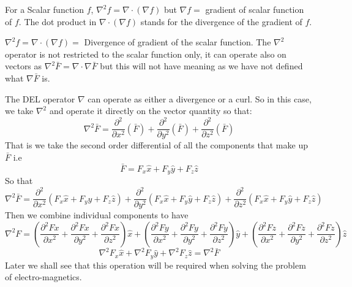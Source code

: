 For a Scalar function $f$, $\nabla^2f = \nabla \cdot (\nabla f)$ but $\nabla f =$ gradient of scalar function of $f$. The dot product in $\nabla \cdot (\nabla f) $ stands for the divergence of the gradient of $f$.

$\nabla^2 f= \nabla \cdot (\nabla f) =$ Divergence of gradient of the scalar function. The $\nabla^2 $ operator is not restricted to the scalar function only, it can operate also on vectors as $\nabla^2 \bar{F} = \nabla \cdot \nabla \bar{F}$ but this will not have meaning as we have not defined what $\nabla \bar{F}$ is.


The DEL operator $\nabla$ can operate as either a divergence or a curl. So in this case, we take $\nabla^2$ and operate it directly on the vector quantity so that:
\begin{dmath}
\nabla^{2} \bar{F} = \frac{\partial ^ {2}}{\partial x^{2}}(\bar{F}) + \frac{\partial ^ {2}}{\partial y^{2}}(\bar{F}) + \frac{\partial ^ {2}}{\partial z^{2}}(\bar{F})
\end{dmath}
That is we take the second order differential of all the components that make up $\bar{F}$ i.e
\begin{equation*}
\bar{F} = F_{x}\hat x + F_{y}\hat y + F_{z}\hat z
\end{equation*}
So that
\begin{dmath}
\nabla^{2} \bar{F} = \frac{\partial ^ {2}}{\partial x^{2}}(F_{x}\hat x + F_{y}\hat y + F_{z}\hat z) + \frac{\partial ^ {2}}{\partial y^{2}}(F_{x}\hat x + F_{y}\hat y + F_{z}\hat z) + 
\frac{\partial ^ {2}}{\partial z^{2}}(F_{x}\hat x + F_{y}\hat y + F_{z}\hat z)
\end{dmath}
Then we combine individual components to have
\begin{dmath*}
\nabla^{2}F = (\frac{\partial ^{2} Fx}{\partial x^2} + \frac{\partial ^{2} Fx}{\partial y^2} + \frac{\partial ^{2} Fx}{\partial z^2})\hat{x} + (\frac{\partial ^{2} Fy}{\partial x^2} + \frac{\partial ^{2} Fy}{\partial y^2} + \frac{\partial ^{2} Fy}{\partial z^2})\hat{y} + (\frac{\partial ^{2} Fz}{\partial x^2} + \frac{\partial ^{2} Fz}{\partial y^2} + \frac{\partial ^{2} Fz}{\partial z^2})\hat{z}
\end{dmath*}
\begin{dmath}
\nabla^{2}F_x \hat x + \nabla^{2}F_y \hat y + \nabla^{2}F_z \hat z = \nabla^{2}\bar{F}
\end{dmath}
Later we shall see that this operation will be required when solving the problem of electro-magnetics.


